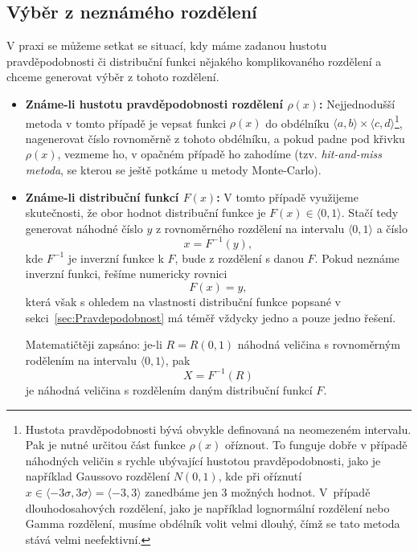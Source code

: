 \documentclass[a4paper,11pt,twoside]{article}
\theoremstyle{red}
\theoremstyle{green}
\begin{document}
    \subsection{Výběr z neznámého rozdělení}\label{sec:SelectDistribution}
        V praxi se můžeme setkat se situací, kdy máme zadanou hustotu pravděpodobnosti či distribuční funkci nějakého komplikovaného rozdělení a chceme generovat výběr z tohoto rozdělení.

        \begin{itemize}
            \item {\bf Známe-li hustotu pravděpodobnosti rozdělení $\rho(x)$:}
                Nejjednodušší metoda v tomto případě je vepsat funkci $\rho(x)$ do obdélníku $\langle a,b\rangle\times\langle c,d\rangle$\footnote{
                    Hustota pravděpodobnosti bývá obvykle definovaná na neomezeném intervalu.
                    Pak je nutné určitou část funkce $\rho(x)$ oříznout.
                    To funguje dobře v případě náhodných veličin s rychle ubývající hustotou pravděpodobnosti, jako je například Gaussovo rozdělení $N(0,1)$, kde při oříznutí $x\in\langle-3\sigma,3\sigma\rangle=\langle-3,3\rangle$ zanedbáme jen 3\textperthousand{} možných hodnot.
                    V~případě dlouhodosahových rozdělení, jako je například lognormální rozdělení nebo Gamma rozdělení, musíme obdélník volit velmi dlouhý, čímž se tato metoda stává velmi neefektivní.
                }, nagenerovat číslo rovnoměrně z tohoto obdélníku, a pokud padne pod křivku $\rho(x)$, vezmeme ho, v opačném případě ho zahodíme (tzv. \emph{hit-and-miss metoda}, se kterou se ještě potkáme u metody Monte-Carlo).

            \item {\bf Známe-li distribuční funkcí $F(x)$:}
                V tomto případě využijeme skutečnosti, že obor hodnot distribuční funkce je $F(x)\in\langle0,1\rangle$. 
                Stačí tedy generovat náhodné číslo $y$ z rovnoměrného rozdělení na intervalu $\langle0,1\rangle$ a číslo 
                \begin{equation}
                    \label{eq:xF}
                    x=F^{-1}(y),
                \end{equation}
                kde $F^{-1}$ je inverzní funkce k $F$, bude z rozdělení s danou $F$.
                Pokud neznáme inverzní funkci, řešíme numericky rovnici
                \begin{equation}
                    F(x)=y,
                \end{equation}
                která však s ohledem na vlastnosti distribuční funkce popsané v sekci~\ref{sec:Pravdepodobnost} má téměř vždycky jedno a pouze jedno řešení.

                Matematičtěji zapsáno: je-li $R=R(0,1)$ náhodná veličina s rovnoměrným rodělením na intervalu $\langle0,1\rangle$, pak
                \begin{equation}
                    X=F^{-1}(R)
                \end{equation}
                je náhodná veličina s rozdělením daným distribuční funkcí $F$.
        \end{itemize}
\end{document}
